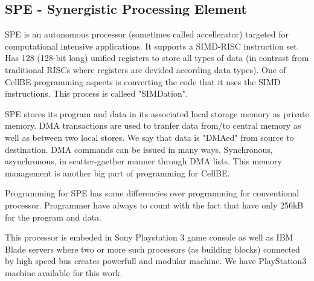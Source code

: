 \subsection{SPE - Synergistic Processing Element}
SPE is an autonomous processor (sometimes called accellerator) targeted for computational intensive applications.
It supports a SIMD-RISC instruction set.
Has 128 (128-bit long) unified registers to store all types of data (in contrast from traditional RISCs where registers are devided according data types).
One of CellBE programming aspects is converting the code that it uses the SIMD instructions.
This process is calleed "SIMDation".

SPE stores its program and data in its associated local storage memory as private memory.
DMA transactions are used to tranfer data from/to central memory as well as between two local stores.
We say that data is "DMAed" from source to destination.
DMA commands can be issued in many ways.
Synchronous, asynchronous, in scatter-gaether manner through DMA lists.
This memory management is another big part of programming for CellBE.

Programming for SPE has some differencies over programming for conventional processor.
Programmer have always to count with the fact that have only 256kB for the program and data.

This processor is embeded in Sony Playstation 3 game console as well as IBM Blade servers where two or more such processors (as building blocks) connected by high speed bus creates powerfull and modular machine.
We have PlayStation3 machine available for this work.
